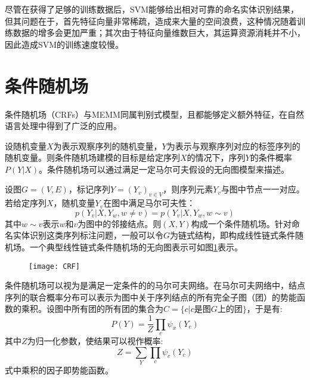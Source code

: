 尽管在获得了足够的训练数据后，SVM能够给出相对可靠的命名实体识别结果，但其问题在于，首先特征向量非常稀疏，造成来大量的空间浪费，这种情况随着训练数据的增多会更加严重；其次由于特征向量维数巨大，其运算资源消耗并不小，因此造成SVM的训练速度较慢。

\section{条件随机场}
条件随机场（CRFs）与MEMM同属判别式模型，且都能够定义额外特征，在自然语言处理中得到了广泛的应用。

设随机变量$X$为表示观察序列的随机变量，$Y$为表示与观察序列对应的标签序列的随机变量。则条件随机场建模的目标是给定序列$X$的情况下，序列$Y$的条件概率$P(Y|X)$。条件随机场可以通过满足一定马尔可夫假设的无向图模型来描述。

设图$G=(V,E)$，标记序列$Y = (Y_v)_{v\in V}$，则序列元素$Y_v$与图中节点一一对应。若给定序列$X$，随机变量$Y_v$在图中满足马尔可夫性：
\begin{equation}
    p(Y_v|X, Y_w, w\neq v) = p(Y_v|X,Y_w,w\sim v)
    \label{eq:Markov-in-CRF}
\end{equation}
其中$w\sim v$表示$w$和$v$为图中的邻接结点。则$(X, Y)$构成一个条件随机场。针对命名实体识别这类序列标注问题，一般可以令$G$为链式结构，即构成线性链式条件随机场。一个典型线性链式条件随机场的无向图表示可如图\ref{fig:CRF}表示。

\begin{figure}[H]
    \centering
    \texttt{[image: CRF]}
    \label{fig:CRF}
\end{figure}

条件随机场可以视为是满足一定条件的的马尔可夫网络。在马尔可夫网络中，结点序列的联合概率分布可以表示为图中关于序列结点的所有完全子图（团）的势能函数的乘积。设图中所有团的所有团的集合为$C = \{c|c$是图$G$上的团$\}$，于是有:
\begin{equation}
    P(Y) = \frac{1}{Z}\prod_{c}\psi_x(Y_c)
\end{equation}
其中$Z$为归一化参数，使结果可以视作概率:
\begin{equation}
    Z = \sum_Y\prod_c \psi_c(Y_c)
\end{equation}
式中乘积的因子即势能函数。

